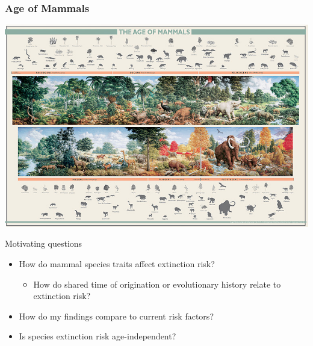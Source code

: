 \documentclass{beamer}
\begin{document}
\begin{frame}
  \frametitle{Age of Mammals}
  \begin{center}
    \includegraphics[width = \textwidth,height = 0.8\textheight,keepaspectratio = true]{figure/aom}
  \end{center}
\end{frame}

\begin{frame}
  \begin{block}{Motivating questions}
    \begin{itemize}
      \item \alert{How do mammal species traits affect extinction risk?}
        \begin{itemize}
          \item How do shared time of origination or evolutionary history relate to extinction risk?
        \end{itemize}
      \item How do my findings compare to current risk factors?
      \item Is species extinction risk age-independent?
    \end{itemize}
  \end{block}
\end{frame}
\end{document}
